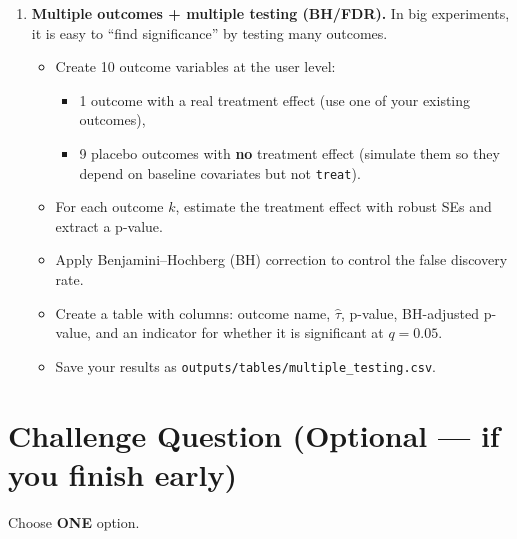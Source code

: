 \documentclass[11pt]{article}
\begin{document}
\begin{enumerate}
\item \textbf{Multiple outcomes + multiple testing (BH/FDR).}
In big experiments, it is easy to ``find significance'' by testing many outcomes.
\begin{itemize}
  \item Create 10 outcome variables at the user level:
    \begin{itemize}
      \item 1 outcome with a real treatment effect (use one of your existing outcomes),
      \item 9 placebo outcomes with \textbf{no} treatment effect (simulate them so they depend on baseline covariates but not \texttt{treat}).
    \end{itemize}
  \item For each outcome $k$, estimate the treatment effect with robust SEs and extract a p-value.
  \item Apply Benjamini--Hochberg (BH) correction to control the false discovery rate.
  \item Create a table with columns: outcome name, $\hat{\tau}$, p-value, BH-adjusted p-value, and an indicator for whether it is significant at $q=0.05$.
  \item Save your results as \texttt{outputs/tables/multiple\_testing.csv}.
\end{itemize}

\end{enumerate}

\section*{Challenge Question (Optional --- if you finish early)}
Choose \textbf{ONE} option.
\end{document}
